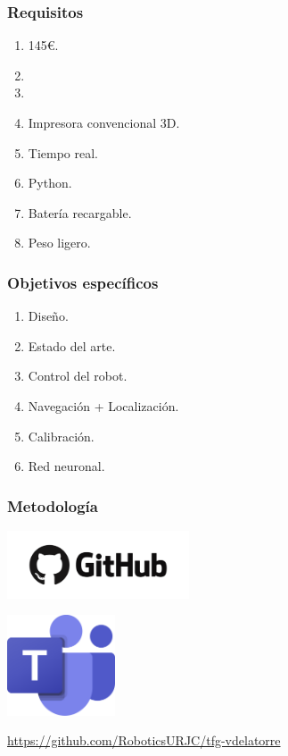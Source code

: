 \documentclass{beamer}
\begin{document}
\begin{frame}
\frametitle{Requisitos}
\begin{enumerate}
    \item 145€.
    \item \faDollarSign
    \item \faWifi %
    \item Impresora convencional 3D.
    \item Tiempo real.
    \item Python.
    \item Batería recargable.
    \item Peso ligero.
\end{enumerate}
\end{frame}

\begin{frame}
\frametitle{Objetivos específicos}
\begin{enumerate}
\item Diseño.
\item Estado del arte.
\item Control del robot.
\item Navegación + Localización.
\item Calibración.
\item Red neuronal.
\end{enumerate}
\end{frame}

\begin{frame}
\frametitle{Metodología}
\centering
\begin{minipage}{0.45\textwidth}
    \centering
    \includegraphics[width=5.4cm]{figs/git.png}
\end{minipage}
\hfill
\begin{minipage}{0.45\textwidth}
    \centering
    \includegraphics[width=3.2cm]{figs/teams.png}
\end{minipage}
\vfill

\href{https://github.com/RoboticsURJC/tfg-vdelatorre}{https://github.com/RoboticsURJC/tfg-vdelatorre}
\end{frame}
\end{document}
